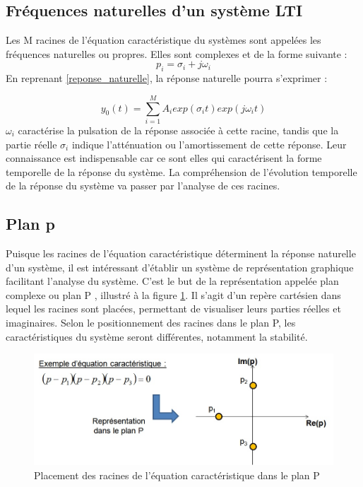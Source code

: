 \documentclass[]{book}
\begin{document}
{	\subsection{Fréquences naturelles d'un système LTI}
	Les M racines de l'équation caractéristique du systèmes sont appelées les fréquences naturelles ou propres. Elles sont complexes et de la forme suivante :
	\begin{equation}\label{freq_propre}
	p_{i} = \sigma_{i} + j\omega_{i} 
	\end{equation}	
	En reprenant \ref{reponse_naturelle}, la réponse naturelle pourra s'exprimer :
		
	\begin{equation}\label{Reponse_Naturelle}
	y_{0}(t) = \sum_{i=1}^M A_{i}exp(\sigma_{i}  t) exp(j\omega_{i} t)
	\end{equation}
	$\omega_{i}$ caractérise la pulsation de la réponse associée à cette racine, tandis que la partie réelle $\sigma_{i}$ indique l'atténuation ou l'amortissement de cette réponse. Leur connaissance est indispensable car ce sont elles qui caractérisent la forme temporelle de la réponse du système. La compréhension de l'évolution temporelle de la réponse du système va passer par l'analyse de ces racines. 
	
	\subsection{Plan p}
	Puisque les racines de l'équation caractéristique déterminent la réponse naturelle d'un système, il est intéressant d'établir un système de représentation graphique facilitant l'analyse du système. C'est le but de la représentation appelée plan complexe ou plan P , illustré à la figure \ref{Fig:Plan_P}. Il s'agit d'un repère cartésien dans lequel les racines sont placées, permettant de visualiser leurs parties réelles et imaginaires. Selon le positionnement des racines dans le plan P, les caractéristiques du système seront différentes, notamment la stabilité.
	\begin{figure}[h!]
		\centering
		\includegraphics[scale=0.5]{images/Plan_P.jpg} 
		\caption{Placement des racines de l'équation caractéristique dans le plan P}	
		\label{Fig:Plan_P}
	\end{figure}

}
\end{document}
